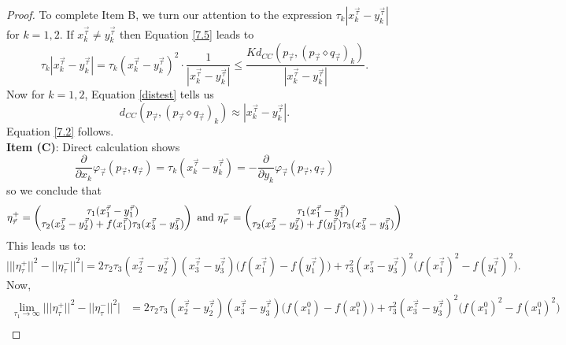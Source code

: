 \documentclass[reqno]{amsart}
\begin{document}
\begin{proof}
 To complete Item B, we turn our attention to the expression $\tau_k|x_k^{\vec{\tau}}-y_k^{\vec{\tau}}|$ for $k=1,2$. If $x_k^{\vec{\tau}}\neq y_k^{\vec{\tau}}$ then  Equation \eqref{7.5} leads to
\begin{equation}\label{7.6}
\tau_k|x_k^{\vec{\tau}}-y_k^{\vec{\tau}}|=\tau_k(x_k^{\vec{\tau}}-y_k^{\vec{\tau}})^2\cdot\frac{1}{|x_k^{\vec{\tau}}-y_k^{\vec{\tau}}|}\leq\frac{Kd_{CC}(p_{\vec{\tau}}, (p_{\vec{\tau}}\diamond q_{\vec{\tau}})_k)}{|x_k^{\vec{\tau}}-y_k^{\vec{\tau}}|}.%
\end{equation}
Now for $k=1,2$, Equation \eqref{distest} tells us
\begin{equation}\label{7.7}
d_{CC}(p_{\vec{\tau}}, (p_{\vec{\tau}}\diamond q_{\vec{\tau}})_k)\approx |x_k^{\vec{\tau}}-y_k^{\vec{\tau}}|.
\end{equation}
Equation \eqref{7.2} follows.\\ 
\textbf{Item (C)}:
Direct calculation shows
\[\frac{\partial }{\partial x_k}\varphi_{\vec{\tau}}(p_{\vec{\tau}},q_{\vec{\tau}})=\tau_k(x_k^{\vec{\tau}}-y_k^{\vec{\tau}})=-\frac{\partial }{\partial y_k}\varphi_{\vec{\tau}}(p_{\vec{\tau}},q_{\vec{\tau}})\]
so we conclude that
\begin{eqnarray}\label{etadef}
\eta^+_{\vec{\tau}}=
\begin{pmatrix}
\tau_1(x^{\vec{\tau}}_1-y^{\vec{\tau}}_1)\\
\tau_2(x^{\vec{\tau}}_2-y^{\vec{\tau}}_2) +f(x_1^{\vec{\tau}})\tau_3(x^{\vec{\tau}}_3-y^{\vec{\tau}}_3)
\end{pmatrix}
\textmd{\ and\ }
\eta^-_{\vec{\tau}}=
\begin{pmatrix}
\tau_1(x^{\vec{\tau}}_1-y^{\vec{\tau}}_1)\\
\tau_2(x^{\vec{\tau}}_2-y^{\vec{\tau}}_2)+f(y_1^{\vec{\tau}})\tau_3(x^{\vec{\tau}}_3-y^{\vec{\tau}}_3)
\end{pmatrix}
\end{eqnarray}
This leads us to:
\[\big|||\eta_\tau^+||^2-||\eta_\tau^-||^2\big|=2\tau_2\tau_3(x^{\vec{\tau}}_2-y^{\vec{\tau}}_2)(x^{\vec{\tau}}_3-y^{\vec{\tau}}_3)\big(f(x_1^{\vec{\tau}})-f(y_1^{\vec{\tau}})\big)+\tau^2_3(x^{\tau}_3-y^{\vec{\tau}}_3)^2\big(f(x_1^{\vec{\tau}})^2-f(y_1^{\vec{\tau}})^2\big).\]
Now,
\begin{align*}
\lim_{\tau_1\to \infty}\big|||\eta_\tau^+||^2-||\eta_\tau^-||^2\big|&=2\tau_2\tau_3(x^{\vec{\tau}}_2-y^{\vec{\tau}}_2)(x^{\vec{\tau}}_3-y^{\vec{\tau}}_3)\big(f(x_1^0)-f(x_1^0)\big)+\tau_3^2(x^{\vec{\tau}}_3-y^{\vec{\tau}}_3)^2\big(f(x_1^0)^2-f(x_1^0)^2\big)\\

\end{align*}
\end{proof}
\end{document}
